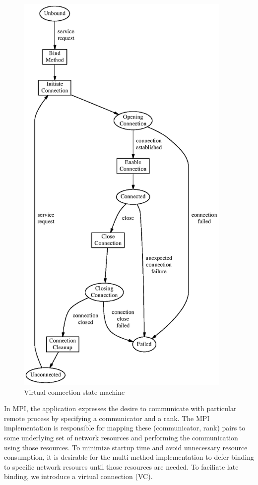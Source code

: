 \documentclass[11pt,letterpaper]{article}
\begin{document}
\begin{figure}
\begin{center}
\includegraphics[height=8in]{vc-sm.eps}
\caption{\label{fig:vc-sm} Virtual connection state machine}
\end{center}
\end{figure}


In MPI, the application expresses the desire to communicate with particular
remote process by specifying a communicator and a rank.  The MPI implementation
is responsible for mapping these (communicator, rank) pairs to some underlying
set of network resources and performing the communication using those
resources.  To minimize startup time and avoid unnecessary resource
consumption, it is desirable for the multi-method implementation to defer
binding to specific network resoures until those resources are needed.  To
faciliate late binding, we introduce a virtual connection (VC).
\end{document}
